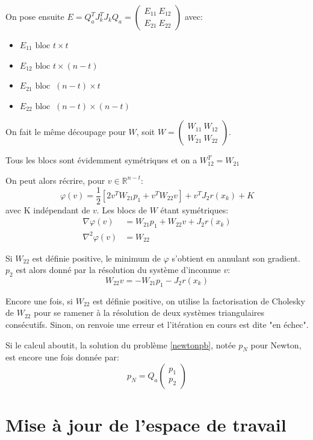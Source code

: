 \documentclass[a4paper,11pt]{article}
\newcommand{\real}{\mathbb{R}}
\numberwithin{equation}{section}
\begin{document}
On pose ensuite $E =  Q_{a}^TJ_{k}^TJ_{k}Q_{a} = \begin{pmatrix} E_{11}\ E_{12} \\ E_{21}\ E_{22} \end{pmatrix}$ avec:
\begin{itemize}
\item
$E_{11} \text{ bloc } t\times t$
\item
$E_{12} \text{ bloc } t\times (n-t)$
\item
$E_{21}\text{ bloc } \ (n-t)\times t$
\item
$E_{22}\text{ bloc }\ (n-t)\times (n-t)$
\end{itemize}

On fait le même découpage pour $W$, soit $W = \begin{pmatrix} W_{11}\ W_{12} \\ W_{21}\ W_{22} \end{pmatrix}$. 

Tous les blocs sont évidemment symétriques et on a $W_{12}^T = W_{21}$

On peut alors récrire, pour $v \in \real^{n-t}$: $$\varphi(v) = \dfrac{1}{2} \left[2v^TW_{21}p_1 + v^TW_{22}v\right] + v^TJ_2r(x_{k}) + K$$ avec K indépendant de $v$. Les blocs de $W$ étant symétriques:
$$ \begin{aligned}\nabla \varphi(v) &= W_{21}p_1 + W_{22}v + J_2r(x_{k}) \\
\nabla^2 \varphi(v) &= W_{22} \end{aligned}$$

Si $W_{22}$ est définie positive, le minimum de $\varphi$ s'obtient en annulant son gradient. $p_{2}$ est alors donné par la résolution du système d'inconnue $v$: $$W_{22}v = -W_{21}p_{1} -  J_2r(x_{k})$$ 

Encore une fois, si $W_{22}$ est définie positive, on utilise la factorisation de Cholesky de $W_{22}$ pour se ramener à la résolution de deux systèmes triangulaires consécutifs. Sinon, on renvoie une erreur et l'itération en cours est dite "en échec".

Si le calcul aboutit, la solution du problème \eqref{newtonpb}, notée $p_{N}$ pour Newton, est encore une fois donnée par:
$$ p_{N} = Q_{a}\begin{pmatrix}p_{1}\\ p_{2} \end{pmatrix}$$


\section{Mise à jour de l'espace de travail} \label{working-set}
\end{document}
